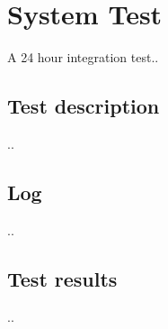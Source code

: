 \chapter{System Test}\label{chap:system_test_chapter}

A 24 hour integration test..




\section{Test description}
..

\section{Log}
..

\section{Test results}
..





